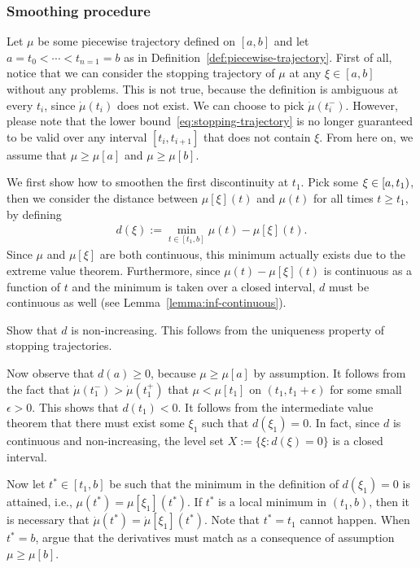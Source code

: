 \documentclass[a4paper]{article}
\theoremstyle{definition}
\theoremstyle{plain}
\begin{document}
\subsubsection{Smoothing procedure}
Let $\mu$ be some piecewise trajectory defined on $[a, b]$ and let
$a = t_{0} < \cdots < t_{n=1} = b$ as in
Definition~\ref{def:piecewise-trajectory}.
%
First of all, notice that we can consider the stopping trajectory of $\mu$ at
any $\xi \in [a,b]$ without any problems. {\color{Navy} This is not true,
  because the definition is ambiguous at every $t_{i}$, since $\dot{\mu}(t_{i})$
  does not exist. We can choose to pick $\dot{\mu}(t_{i}^{-})$.} However, please
note that the lower bound~\eqref{eq:stopping-trajectory} is no longer guaranteed
to be valid over any interval $[t_{i}, t_{i+1}]$ that does not contain $\xi$.
%
From here on, we assume that $\mu \geq \mu[a]$ and $\mu \geq \mu[b]$.

We first show how to smoothen the first discontinuity at $t_{1}$.
%
Pick some $\xi \in [a,t_{1})$, then we consider the distance between
$\mu[\xi](t)$ and $\mu(t)$ for all times $t \geq t_{1}$, by defining
\begin{align}
  d(\xi) := \min_{t \in [t_{1}, b]} \mu(t) - \mu[\xi](t) .
\end{align}
Since $\mu$ and $\mu[\xi]$ are both continuous, this minimum actually exists due
to the extreme value theorem.
%
Furthermore, since $\mu(t) - \mu[\xi](t)$ is continuous as a function of $t$ and
the minimum is taken over a closed interval, $d$ must be continuous as well (see
Lemma~\ref{lemma:inf-continuous}).

{\color{Navy} Show that $d$ is non-increasing. This follows from the uniqueness
  property of stopping trajectories.}

Now observe that $d(a) \geq 0$, because $\mu \geq \mu[a]$ by assumption.
%
It follows from the fact that $\dot{\mu}(t_{1}^{-}) > \dot{\mu}(t_{1}^{+})$ that
$\mu < \mu[t_{1}]$ on $(t_{1}, t_{1} + \epsilon)$ for some small $\epsilon > 0$.
This shows that $d(t_{1}) < 0$.
%
It follows from the intermediate value theorem that there must exist some $\xi_{1}$ such that $d(\xi_{1}) = 0$.
%
In fact, since $d$ is continuous and non-increasing, the level set
$X := \{ \xi: d(\xi) = 0 \}$ is a closed interval.

Now let $t^{*} \in [t_{1}, b]$ be such that the minimum in the definition of
$d(\xi_{1}) = 0$ is attained, i.e., $\mu(t^{*}) = \mu[\xi_{1}](t^{*})$.
%
If $t^{*}$ is a local minimum in $(t_{1}, b)$, then it is necessary that
$\dot{\mu}(t^{*}) = \dot{\mu}[\xi_{1}](t^{*})$. Note that $t^{*}=t_{1}$ cannot
happen. {\color{Navy}When $t^{*} = b$, argue that the derivatives must match as
  a consequence of assumption $\mu \geq \mu[b]$.}
\end{document}
